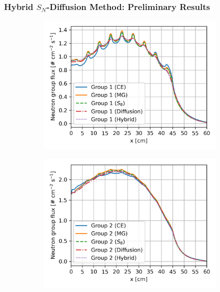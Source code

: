 \begin{frame}
  \frametitle{Hybrid $S_N$-Diffusion Method: Preliminary Results}
  \begin{figure}[htb!]
    \centering
    \begin{subfigure}[t]{.35\textwidth}
      \centering
      \includegraphics[width=\textwidth]{../images/case-5a-group-1-flux}
      \label{fig:c5ag1}
    \end{subfigure}
    \begin{subfigure}[t]{.35\textwidth}
      \centering
      \includegraphics[width=\textwidth]{../images/case-5a-group-2-flux}
      \label{fig:c5ag2}
    \end{subfigure}
    \begin{subfigure}[t]{.35\textwidth}

\end{subfigure}
\end{figure}
\end{frame}
